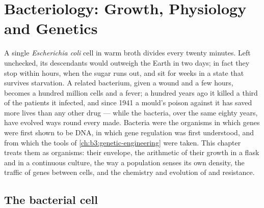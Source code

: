 \chapter{Bacteriology: Growth, Physiology and Genetics}\label{ch:b3:bacteriology}

A single \emph{Escherichia coli} cell in warm broth divides every
twenty minutes. Left unchecked, its descendants would outweigh the
Earth in two days; in fact they stop within hours, when the sugar runs
out, and sit for weeks in a state that survives starvation. A related
bacterium, given a wound and a few hours, becomes a hundred million
cells and a fever; a hundred years ago it killed a third of the
patients it infected, and since 1941 a mould's poison against it has
saved more lives than any other drug --- while the bacteria, over the
same eighty years, have evolved ways round every  made.
Bacteria were the organisms in which genes were first shown to be
DNA, in which gene regulation was first understood, and from which
the tools of \cref{ch:b3:genetic-engineering} were taken. This chapter
treats them as organisms: their envelope, the arithmetic of their
growth in a flask and in a continuous culture, the way a population
senses its own density, the traffic of genes between cells, and the
chemistry and evolution of  and resistance.

\section{The bacterial cell}


